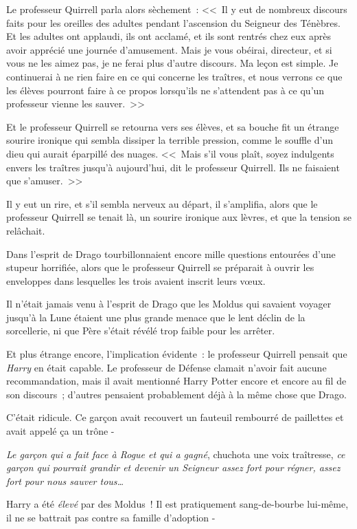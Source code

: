 Le professeur Quirrell parla alors sèchement~: <<~Il y eut de nombreux discours faits pour les oreilles des adultes pendant l'ascension du Seigneur des Ténèbres. Et les adultes ont applaudi, ils ont acclamé, et ils sont rentrés chez eux après avoir apprécié une journée d'amusement. Mais je vous obéirai, directeur, et si vous ne les aimez pas, je ne ferai plus d'autre discours. Ma leçon est simple. Je continuerai à ne rien faire en ce qui concerne les traîtres, et nous verrons ce que les élèves pourront faire à ce propos lorsqu'ils ne s'attendent pas à ce qu'un professeur vienne les sauver.~>>

Et le professeur Quirrell se retourna vers ses élèves, et sa bouche fit un étrange sourire ironique qui sembla dissiper la terrible pression, comme le souffle d'un dieu qui aurait éparpillé des nuages. <<~Mais s'il vous plaît, soyez indulgents envers les traîtres jusqu'à aujourd'hui, dit le professeur Quirrell. Ils ne faisaient que s'amuser.~>>

Il y eut un rire, et s'il sembla nerveux au départ, il s'amplifia, alors que le professeur Quirrell se tenait là, un sourire ironique aux lèvres, et que la tension se relâchait.

\later

Dans l'esprit de Drago tourbillonnaient encore mille questions entourées d'une stupeur horrifiée, alors que le professeur Quirrell se préparait à ouvrir les enveloppes dans lesquelles les trois avaient inscrit leurs vœux.

Il n'était jamais venu à l'esprit de Drago que les Moldus qui savaient voyager jusqu'à la Lune étaient une plus grande menace que le lent déclin de la sorcellerie, ni que Père s'était révélé trop faible pour les arrêter.

Et plus étrange encore, l'implication évidente~: le professeur Quirrell pensait que \emph{Harry} en était capable. Le professeur de Défense clamait n'avoir fait aucune recommandation, mais il avait mentionné Harry Potter encore et encore au fil de son discours~; d'autres pensaient probablement déjà à la même chose que Drago.

C'était ridicule. Ce garçon avait recouvert un fauteuil rembourré de paillettes et avait appelé ça un trône -

\emph{Le garçon qui a fait face à Rogue et qui a gagné}, chuchota une voix traîtresse, \emph{ce garçon qui pourrait grandir et devenir un Seigneur assez fort pour régner, assez fort pour nous sauver tous…}

Harry a été \emph{élevé} par des Moldus~! Il est pratiquement sang-de-bourbe lui-même, il ne se battrait pas contre sa famille d'adoption -

